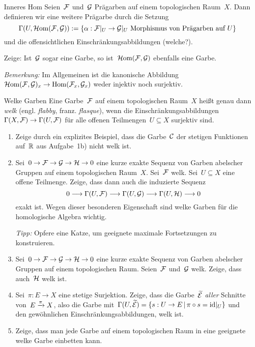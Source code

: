 \documentclass{uebblatt}
\begin{document}
\begin{aufgabe}{Inneres Hom}
Seien~$\mathcal{F}$ und~$\mathcal{G}$ Prägarben auf einem topologischen Raum~$X$. Dann
definieren wir eine weitere Prägarbe durch die Setzung
\[ \Gamma(U, \mathcal{H}\mathrm{om}(\mathcal{F},\mathcal{G})) := \{ \alpha : \mathcal{F}|_U \to \mathcal{G}|_U \text{ Morphismus von Prägarben auf~$U$} \} \]
und die offensichtlichen Einschränkungsabbildungen (welche?).

Zeige: Ist~$\mathcal{G}$ sogar eine Garbe, so ist~$\mathcal{H}\mathrm{om}(\mathcal{F},\mathcal{G})$ ebenfalls eine Garbe.

\emph{Bemerkung:} Im Allgemeinen ist die kanonische
Abbildung~$\mathcal{H}\mathrm{om}(\mathcal{F},\mathcal{G})_x \to \mathrm{Hom}(\mathcal{F}_x,\mathcal{G}_x)$ weder injektiv noch surjektiv.
\end{aufgabe}

\newpage

\begin{aufgabe}{Welke Garben}
Eine Garbe~$\mathcal{F}$ auf einem topologischen Raum~$X$ heißt genau dann \emph{welk}
(engl. \emph{flabby}, franz. \emph{flasque}),
wenn die Einschränkungsabbildungen~$\Gamma(X,\mathcal{F}) \to \Gamma(U,\mathcal{F})$ für alle
offenen Teilmengen~$U \subseteq X$ surjektiv sind.

\begin{enumerate}
\item Zeige durch ein explizites Beispiel, dass die Garbe~$\mathcal{C}$ der stetigen
Funktionen auf~$\mathbb{R}$ aus Aufgabe~1b) nicht welk ist.
\item Sei~$0 \to \mathcal{F} \to \mathcal{G} \to \mathcal{H} \to 0$ eine kurze exakte Sequenz von Garben
abelscher Gruppen auf einem topologischen Raum~$X$. Sei~$\mathcal{F}$ welk. Sei~$U
\subseteq X$ eine offene Teilmenge. Zeige, dass
dann auch die induzierte Sequenz
\[ 0 \longrightarrow \Gamma(U,\mathcal{F}) \longrightarrow \Gamma(U,\mathcal{G}) \longrightarrow \Gamma(U,\mathcal{H}) \longrightarrow 0 \]
exakt ist. Wegen dieser besonderen Eigenschaft sind welke Garben für die
homologische Algebra wichtig.

\emph{Tipp:} Opfere eine Katze, um geeignete maximale Fortsetzungen
zu konstruieren.
\item Sei~$0 \to \mathcal{F} \to \mathcal{G} \to \mathcal{H} \to 0$ eine kurze exakte Sequenz von Garben
abelscher Gruppen auf einem topologischen Raum. Seien~$\mathcal{F}$ und~$\mathcal{G}$ welk.
Zeige, dass auch~$\mathcal{H}$ welk ist.
\item Sei~$\pi : E \to X$ eine stetige Surjektion. Zeige, dass die
Garbe~$\widetilde{\mathcal{E}}$ \emph{aller} Schnitte von~$E \xrightarrow{\pi} X$, also die Garbe
mit~$\Gamma(U,\widetilde{\mathcal{E}}) = \{ s : U \to E \,|\, \pi
\circ s = \mathrm{id}|_U \}$ und den gewöhnlichen Einschränkungsabbildungen, welk ist.
\item Zeige, dass man jede Garbe auf einem topologischen Raum in eine geeignete
welke Garbe einbetten kann.
\end{enumerate}
\end{aufgabe}
\end{document}
